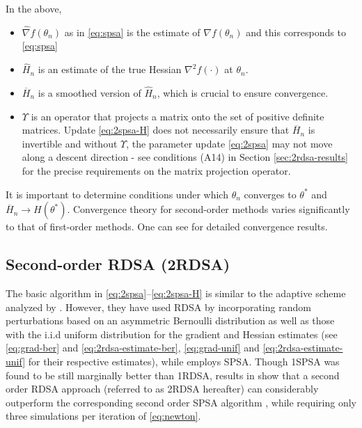 In the above, 
\begin{itemize}
 \item $\widehat\nabla f(\theta_n)$ as in \eqref{eq:spsa} is the estimate of $\nabla f(\theta_n)$ and this corresponds to \eqref{eq:spsa} 
  \item $\widehat H_n$ is an estimate of the true Hessian ${\nabla}^2 f(\cdot)$ at $\theta_n$. 
 \item $\overline H_n$ is a smoothed version of $\widehat H_n$, which is crucial to ensure convergence. 
 \item $\Upsilon$ is an operator that projects a matrix onto the set of positive definite matrices. Update \eqref{eq:2spsa-H} does not necessarily ensure that $\overline H_n$ is invertible and without $\Upsilon$, the parameter update \eqref{eq:2spsa} may not move along a descent direction - see conditions (A14)  in Section \ref{sec:2rdsa-results}  for the precise requirements on the matrix projection operator.
\end{itemize}
It is important to determine conditions under which $\theta_n$ converges to $\theta^*$ and $\overline H_n \to H(\theta^*)$. Convergence theory for second-order methods varies significantly to that of first-order methods. One can see \cite{spall_adaptive} for detailed convergence results.
\subsection{Second-order RDSA (2RDSA)}
The basic algorithm in \eqref{eq:2spsa}--\eqref{eq:2spsa-H} is similar to the adaptive scheme analyzed by \cite{prashanth2015rdsa}. However, they have used RDSA by incorporating random perturbations based on an asymmetric Bernoulli
distribution as well as those with the  i.i.d uniform distribution for the gradient and Hessian estimates (see \eqref{eq:grad-ber} and \eqref{eq:2rdsa-estimate-ber}, \eqref{eq:grad-unif} and \eqref{eq:2rdsa-estimate-unif} for their respective estimates), while \cite{spall_adaptive} employs SPSA. Though 1SPSA was found to be still marginally better than 1RDSA, results in \cite{prashanth2015rdsa} show that a second order RDSA approach (referred to as 2RDSA hereafter) can considerably outperform the corresponding second order SPSA algorithm \cite{spall_adaptive}, while requiring only three simulations per iteration of \eqref{eq:newton}.
